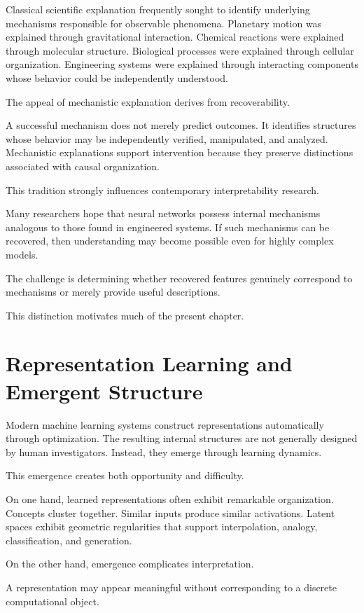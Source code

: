 \documentclass[11pt,oneside,openany]{book}
\begin{document}
Classical scientific explanation frequently sought to identify underlying mechanisms responsible for observable phenomena. Planetary motion was explained through gravitational interaction. Chemical reactions were explained through molecular structure. Biological processes were explained through cellular organization. Engineering systems were explained through interacting components whose behavior could be independently understood.

The appeal of mechanistic explanation derives from recoverability.

A successful mechanism does not merely predict outcomes. It identifies structures whose behavior may be independently verified, manipulated, and analyzed. Mechanistic explanations support intervention because they preserve distinctions associated with causal organization.

This tradition strongly influences contemporary interpretability research.

Many researchers hope that neural networks possess internal mechanisms analogous to those found in engineered systems. If such mechanisms can be recovered, then understanding may become possible even for highly complex models.

The challenge is determining whether recovered features genuinely correspond to mechanisms or merely provide useful descriptions.

This distinction motivates much of the present chapter.

\section{Representation Learning and Emergent Structure}

Modern machine learning systems construct representations automatically through optimization. The resulting internal structures are not generally designed by human investigators. Instead, they emerge through learning dynamics.

This emergence creates both opportunity and difficulty.

On one hand, learned representations often exhibit remarkable organization. Concepts cluster together. Similar inputs produce similar activations. Latent spaces exhibit geometric regularities that support interpolation, analogy, classification, and generation.

On the other hand, emergence complicates interpretation.

A representation may appear meaningful without corresponding to a discrete computational object.
\end{document}
